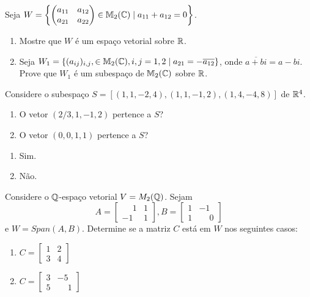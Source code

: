 \documentclass[12pt]{exam}
\begin{document}
\begin{exercicio}
	Seja $W = \left\{\begin{pmatrix} a_{11} & a_{12}\\ a_{21} & a_{22}\end{pmatrix} \in \mathbb{M}_2(\mathbb{C}) \mid a_{11} + a_{12} = 0\right\}$.
	\begin{enumerate}[label={\alph*})]
		\item Mostre que $W$ \'e um espa\c{c}o vetorial sobre $\mathbb{R}$.

		\item Seja $W_1 = \{(a_{ij})_{i,j}, \in \mathbb{M}_2(\mathbb{C}), i, j = 1, 2 \mid a_{21} = -\overline{a_{12}}\}$, onde $\overline{a + bi} = a - bi$. Prove que $W_1$ \'e um subespa\c{c}o de $\mathbb{M}_2(\mathbb{C})$ sobre $\mathbb{R}$.
	\end{enumerate}
\end{exercicio}

\begin{exercicio}
	Considere o subespa\c{c}o $S = [(1,1,-2,4),(1,1,-1,2),(1,4,-4,8)]$ de $\mathbb{R}^4$.
	\begin{enumerate}[label={\alph*})]
		\item O vetor $(2/3, 1, -1, 2)$ pertence a $S$?
		\item O vetor $(0, 0, 1, 1)$ pertence a $S$?
	\end{enumerate}
	\begin{solucao}
		\begin{enumerate}[label={\alph*})]
			\item Sim.
			\item N\~ao.
		\end{enumerate}
	\end{solucao}
\end{exercicio}

\begin{exercicio}
    Considere o $\mathbb{Q}$-espaço vetorial $V = M_2(\mathbb{Q})$. Sejam
    \[
        A = \begin{bmatrix}
            \phantom{-} 1 & 1\\
            -1 & 1
        \end{bmatrix},
        B = \begin{bmatrix}
            1 & -1\\
            1 & \phantom{-} 0
        \end{bmatrix}
    \]
    e $W = Span(A, B)$. Determine se a matriz $C$ está em $W$ nos seguintes casos:
    \begin{enumerate}[label={\alph*})]
        \item $C = \begin{bmatrix}1 & 2\\3 & 4\end{bmatrix}$

        \item $C = \begin{bmatrix}3 & -5\\5 & \phantom{-} 1\end{bmatrix}$
    \end{enumerate}
\end{exercicio}
\end{document}
